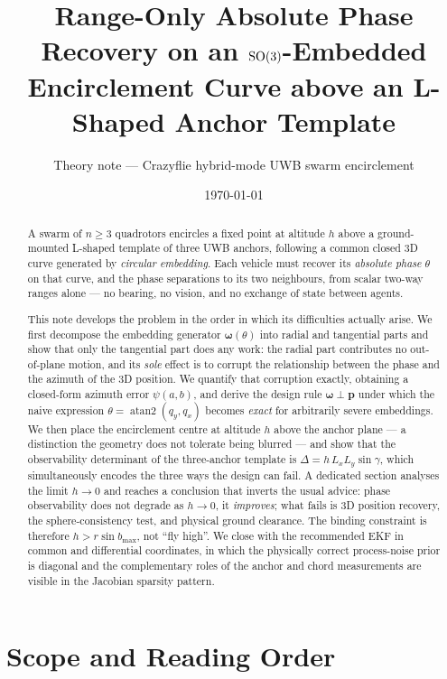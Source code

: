 \documentclass[11pt,a4paper]{article}
\title{\textbf{Range-Only Absolute Phase Recovery on an $\mathrm{SO}(3)$-Embedded\\
Encirclement Curve above an L-Shaped Anchor Template}}
\author{Theory note --- Crazyflie hybrid-mode UWB swarm encirclement}
\date{\today}
\newcommand{\pv}{\bm{p}}
\begin{document}
\maketitle

\begin{abstract}
A swarm of $n\ge 3$ quadrotors encircles a fixed point at altitude $h$ above a
ground-mounted L-shaped template of three UWB anchors, following a common closed
3D curve generated by \emph{circular embedding}. Each vehicle must recover its
\emph{absolute phase} $\theta$ on that curve, and the phase separations to its
two neighbours, from scalar two-way ranges alone --- no bearing, no vision, and
no exchange of state between agents.

This note develops the problem in the order in which its difficulties actually
arise. We first decompose the embedding generator $\bm\omega(\theta)$ into
radial and tangential parts and show that only the tangential part does any
work: the radial part contributes no out-of-plane motion, and its \emph{sole}
effect is to corrupt the relationship between the phase and the azimuth of the
3D position. We quantify that corruption exactly, obtaining a closed-form
azimuth error $\psi(a,b)$, and derive the design rule $\bm\omega\perp\pv$ under
which the naive expression $\theta=\operatorname{atan2}(q_y,q_x)$ becomes
\emph{exact} for arbitrarily severe embeddings. We then place the encirclement
centre at altitude $h$ above the anchor plane --- a distinction the geometry
does not tolerate being blurred --- and show that the observability determinant
of the three-anchor template is $\Delta = h\,L_xL_y\sin\gamma$, which
simultaneously encodes the three ways the design can fail. A dedicated section
analyses the limit $h\to 0$ and reaches a conclusion that inverts the usual
advice: phase observability does not degrade as $h\to 0$, it \emph{improves};
what fails is 3D position recovery, the sphere-consistency test, and physical
ground clearance. The binding constraint is therefore
$h > r\sin b_{\max}$, not ``fly high''. We close with the recommended EKF in
common and differential coordinates, in which the physically correct
process-noise prior is diagonal and the complementary roles of the anchor and
chord measurements are visible in the Jacobian sparsity pattern.
\end{abstract}

\tableofcontents

\section{Scope and Reading Order}
\end{document}
